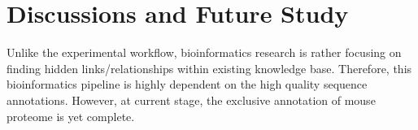 \section{Discussions and Future Study}
Unlike the experimental workflow, bioinformatics research is rather focusing on finding hidden links/relationships within existing knowledge base. Therefore, this bioinformatics pipeline is highly dependent on the high quality sequence annotations. However, at current stage, the exclusive annotation of mouse proteome is yet complete.  